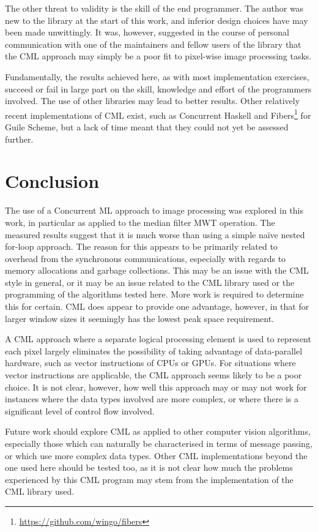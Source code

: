 The other threat to validity is the skill of the end programmer.  The author was new to the \hopac{} library at the start of this work, and inferior design choices have may been made unwittingly.  It was, however, suggested in the course of personal communication with one of the maintainers and fellow users of the \hopac{} library that the CML approach may simply be a poor fit to pixel-wise image processing tasks.

Fundamentally, the results achieved here, as with most implementation exercises, succeed or fail in large part on the skill, knowledge and effort of the programmers involved.  The use of other libraries may lead to better results.  Other relatively recent implementations of CML exist, such as Concurrent Haskell \cite{Chaudhuri2009} and Fibers\footnote{\url{https://github.com/wingo/fibers}} for Guile Scheme, but a lack of time meant that they could not yet be assessed further.

\section{Conclusion}
The use of a Concurrent ML approach to image processing was explored in this work, in particular as applied to the median filter MWT operation.  The measured results suggest that it is much worse than using a simple naïve nested for-loop approach.  The reason for this appears to be primarily related to overhead from the synchronous communications, especially with regards to memory allocations and garbage collections.  This may be an issue with the CML style in general, or it may be an issue related to the CML library used or the programming of the algorithms tested here.  More work is required to determine this for certain.  CML does appear to provide one advantage, however, in that for larger window sizes it seemingly has the lowest peak space requirement.

A CML approach where a separate logical processing element is used to represent each pixel largely eliminates the possibility of taking advantage of data-parallel hardware, such as vector instructions of CPUs or GPUs.  For situations where vector instructions are applicable, the CML approach seems likely to be a poor choice.  It is not clear, however, how well this approach may or may not work for instances where the data types involved are more complex, or where there is a significant level of control flow involved.

Future work should explore CML as applied to other computer vision algorithms, especially those which can naturally be characterised in terms of message passing, or which use more complex data types.  Other CML implementations beyond the one used here should be tested too, as it is not clear how much the problems experienced by this CML program may stem from the implementation of the CML library used.



